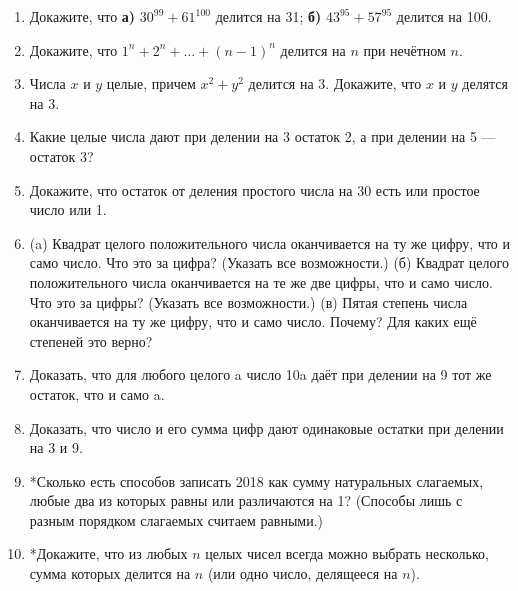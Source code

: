 \begin{enumerate}
\item Докажите, что \textbf{а)} $30^{99} + 61^{100}$ делится на 31; \textbf{б)} $43^{95} + 57^{95}$ делится на 100.
\item Докажите, что $1^n + 2^n + \dots + (n - 1)^n$ делится на $n$ при нечётном $n$.
\item Числа $x$ и $y$ целые, причем $x^2 + y^2$ делится на 3. Докажите, что $x$ и $y$ делятся на 3.
\item Какие целые числа дают при делении на 3 остаток 2, а при делении на 5 --- остаток 3?
\item Докажите, что остаток от деления простого числа на 30 есть или простое число или 1.
\item (a) Квадрат целого положительного числа оканчивается на ту
же цифру, что и само число. Что это за цифра? (Указать все возможности.) (б) Квадрат целого положительного числа оканчивается на те же две цифры, что и само число. Что это за цифры?
(Указать все возможности.) (в) Пятая степень числа оканчивается
на ту же цифру, что и само число. Почему? Для каких ещё степеней
это верно?
\item Доказать, что для любого целого a число 10a даёт при делении
на 9 тот же остаток, что и само a.
\item Доказать, что число и его сумма цифр дают одинаковые остатки при делении на 3 и 9.
\item *Сколько есть способов записать 2018 как сумму натуральных слагаемых, любые два из
которых равны или различаются на 1? (Способы лишь с разным порядком слагаемых считаем равными.)
\item *Докажите, что из любых $n$ целых чисел всегда можно выбрать несколько, сумма которых
делится на $n$ (или одно число, делящееся на $n$).
\end{enumerate}

